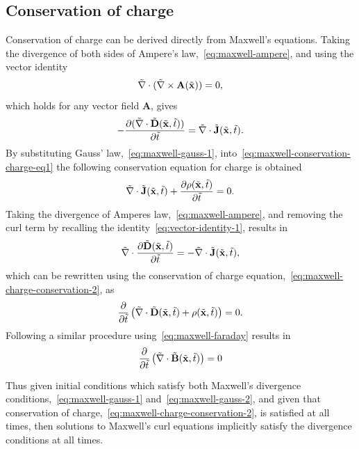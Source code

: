 \subsection{Conservation of charge}
Conservation of charge can be derived directly from Maxwell's equations. Taking the divergence of both sides of Ampere's law,~\eqref{eq:maxwell-ampere}, and using the vector identity
\begin{equation}
  \label{eq:vector-identity-1}
  \tilde{\nabla} \cdot ( \tilde{\nabla} \times \mathbf{A} (\tilde{\mathbf{x}}) ) = 0,
\end{equation}
which holds for any vector field $\mathbf{A}$, gives
\begin{equation}
- \frac{\partial ( \tilde{\nabla} \cdot \tilde{\mathbf{D}}(\tilde{\mathbf{x}},\tilde{t}) ) }{\partial \tilde{t} } = \tilde{\nabla} \cdot \tilde{\mathbf{J}}(\tilde{\mathbf{x}},\tilde{t}) . \label{eq:maxwell-conservation-charge-eq1}
\end{equation}
By substituting Gauss' law,~\eqref{eq:maxwell-gauss-1}, into~\eqref{eq:maxwell-conservation-charge-eq1} the following conservation equation for charge is obtained
\begin{equation}
  \tilde{\nabla} \cdot \tilde{\mathbf{J}}(\tilde{\mathbf{x}},\tilde{t}) + \frac{\partial \rho (\tilde{\mathbf{x}},\tilde{t}) }{\partial \tilde{t} } = 0 .
  \label{eq:maxwell-charge-conservation-2}
\end{equation}
Taking the divergence of Amperes law,~\eqref{eq:maxwell-ampere}, and removing
the curl term by recalling the identity~\eqref{eq:vector-identity-1}, results in
$$
\tilde{\nabla} \cdot \frac{\partial  \tilde{\mathbf{D}}(\tilde{\mathbf{x}}, \tilde{t})}{\partial \tilde{t} } = - \tilde{\nabla}
\cdot \tilde{\mathbf{J}}(\tilde{\mathbf{x}},\tilde{t}),
$$
which can be rewritten using the conservation of charge
equation,~\eqref{eq:maxwell-charge-conservation-2}, as
$$
\frac{\partial }{\partial \tilde{t} } \left(  \tilde{\nabla} \cdot \tilde{\mathbf{D}}(\tilde{\mathbf{x}}, \tilde{t}) +  \rho (\tilde{\mathbf{x}},\tilde{t}) \right)  = 0.
$$
Following a similar procedure using~\eqref{eq:maxwell-faraday} results in
$$
\frac{\partial }{\partial \tilde{t} } \left(\tilde{\nabla} \cdot  \tilde{\mathbf{B}}(\tilde{\mathbf{x}}, \tilde{t})\right) = 0 
$$

Thus given initial conditions which satisfy both Maxwell's divergence
conditions,~\eqref{eq:maxwell-gauss-1} and~\eqref{eq:maxwell-gauss-2}, and given
that conservation of charge,~\eqref{eq:maxwell-charge-conservation-2}, is
satisfied at all times, then solutions to Maxwell's curl equations 
implicitly satisfy the divergence conditions at all times.

